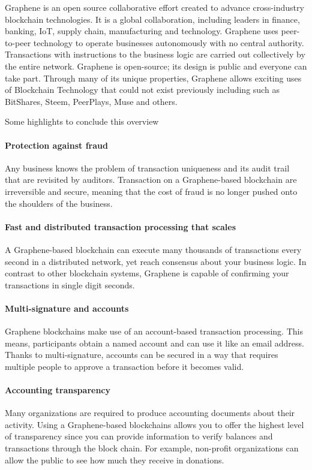 Graphene is an open source collaborative effort created to advance
cross-industry blockchain technologies. It is a global collaboration,
including leaders in finance, banking, IoT, supply chain, manufacturing
and technology.
Graphene uses peer-to-peer technology to operate businesses autonomously
with no central authority. Transactions with instructions to the
business logic are carried out collectively by the entire network.
Graphene is open-source; its design is public and everyone can take
part. Through many of its unique properties, Graphene allows exciting
uses of Blockchain Technology that could not exist previously including
such as BitShares, Steem, PeerPlays, Muse and others.

Some highlights to conclude this overview

\paragraph{Protection against fraud}
Any business knows the problem of transaction uniqueness and its audit
trail that are revisited by auditors. Transaction on a Graphene-based
blockchain are irreversible and secure, meaning that the cost of fraud
is no longer pushed onto the shoulders of the business.

\paragraph{Fast and distributed transaction processing that scales}
A Graphene-based blockchain can execute many thousands of transactions
every second in a distributed network, yet reach consensus about your
business logic. In contrast to other blockchain systems, Graphene is
capable of confirming your transactions in single digit seconds.

\paragraph{Multi-signature and accounts}
Graphene blockchains make use of an account-based transaction
processing. This means, participants obtain a named account and can use
it like an email address. Thanks to multi-signature, accounts can be
secured in a way that requires multiple people to approve a transaction
before it becomes valid.

\paragraph{Accounting transparency}
Many organizations are required to produce accounting documents about
their activity. Using a Graphene-based blockchains allows you to offer
the highest level of transparency since you can provide information to
verify balances and transactions through the block chain. For example,
non-profit organizations can allow the public to see how much they
receive in donations.
